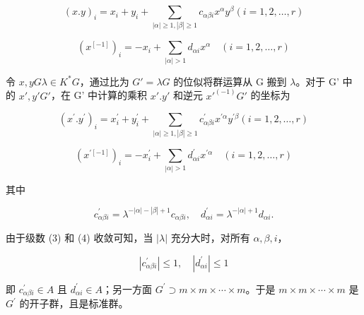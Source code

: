 \[
(x. y) _ {i} = x _ {i} + y _ {i} + \sum_ {| \alpha | \geqslant 1, | \beta | \geqslant 1} c _ {\alpha \beta i} x ^ {\alpha} y ^ {\beta} (i = 1, 2, \dots , r)\tag{3}
\]

\[
(x ^ {[ - 1 ]}) _ {i} = - x _ {i} + \sum_ {| \alpha | > 1} d _ {\alpha i} x ^ {\alpha} \quad (i = 1, 2, \dots , r)\tag{4}
\]

令 \(x, y\)\(G\)\(\lambda \in K^*\)\(G\)，通过比为 \(G' = \lambda G\) 的位似将群运算从 G 搬到 \(\lambda\)。对于 G' 中的 \(x', y'\)\(G'\)，在 G' 中计算的乘积 \(x'.y'\) 和逆元 \(x'^{(-1)}\)\(G'\) 的坐标为

\[
(x ^ {\prime}. y ^ {\prime}) _ {i} = x _ {i} ^ {\prime} + y _ {i} ^ {\prime} + \sum_ {| \alpha | \geqslant 1, | \beta | \geqslant 1} c _ {\alpha \beta i} ^ {\prime} x ^ {\prime \alpha} y ^ {\prime \beta} (i = 1, 2, \dots , r)
\]

\[
(x ^ {\prime [ - 1 ]}) _ {i} = - x _ {i} ^ {\prime} + \sum_ {| \alpha | > 1} d _ {\alpha i} ^ {\prime} x ^ {\prime \alpha} \quad (i = 1, 2, \dots , r)
\]

其中

\[
c _ {\alpha \beta i} ^ {\prime} = \lambda^ {- | \alpha | - | \beta | + 1} c _ {\alpha \beta i}, \quad d _ {\alpha i} ^ {\prime} = \lambda^ {- | \alpha | + 1} d _ {\alpha i}.
\]

由于级数 (3) 和 (4) 收敛可知，当 \(|\lambda|\) 充分大时，对所有 \(\alpha, \beta, i\)，

\[
\left| c _ {\alpha \beta i} ^ {\prime} \right| \leqslant 1, \quad \left| d _ {\alpha i} ^ {\prime} \right| \leqslant 1
\]

即 \(c_{\alpha\beta i}^{\prime}\in A\) 且 \(d_{\alpha i}^{\prime}\in A\)；另一方面 \(G^{\prime}\supset m\times m\times\cdots\times m\)。于是 \(m\times m\times\cdots\times m\) 是 \(G^{\prime}\) 的开子群，且是标准群。

